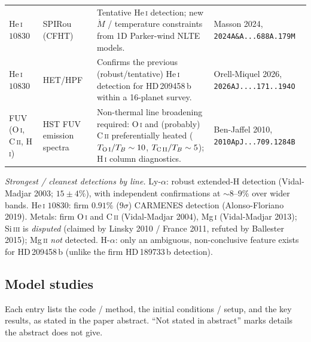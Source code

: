 \begin{longtable}{@{}p{2.3cm}p{2.9cm}p{5.7cm}p{2.6cm}@{}}
He\,\textsc{i} $10830$ & SPIRou (CFHT) & Tentative He\,\textsc{i} detection; new $\dot M$ / temperature constraints from 1D Parker-wind NLTE models. & Masson 2024, \texttt{2024A\&A...688A.179M} \\
He\,\textsc{i} $10830$ & HET/HPF & Confirms the previous (robust/tentative) He\,\textsc{i} detection for HD\,209458\,b within a 16-planet survey. & Orell-Miquel 2026, \texttt{2026AJ....171..194O} \\
FUV (O\,\textsc{i}, C\,\textsc{ii}, H\,\textsc{i}) & HST FUV emission spectra & Non-thermal line broadening required: O\,\textsc{i} and (probably) C\,\textsc{ii} preferentially heated ($T_{\rm O\,I}/T_B\sim10$, $T_{\rm C\,II}/T_B\sim5$); H\,\textsc{i} column diagnostics. & Ben-Jaffel 2010, \texttt{2010ApJ...709.1284B} \\
\end{longtable}

\noindent\textit{Strongest / cleanest detections by line.} Ly-$\alpha$:
robust extended-H detection (Vidal-Madjar 2003; $15\pm4\%$), with independent
confirmations at $\sim8$--$9\%$ over wider bands. He\,\textsc{i} $10830$: firm
$0.91\%$ ($9\sigma$) CARMENES detection (Alonso-Floriano 2019). Metals: firm
O\,\textsc{i} and C\,\textsc{ii} (Vidal-Madjar 2004), Mg\,\textsc{i}
(Vidal-Madjar 2013); Si\,\textsc{iii} is \emph{disputed} (claimed by Linsky
2010 / France 2011, refuted by Ballester 2015); Mg\,\textsc{ii} \emph{not}
detected. H-$\alpha$: only an ambiguous, non-conclusive feature exists for
HD\,209458\,b (unlike the firm HD\,189733\,b detection).

\subsection{Model studies}

Each entry lists the code / method, the initial conditions / setup, and the key
results, as stated in the paper abstract. ``Not stated in abstract'' marks
details the abstract does not give.

